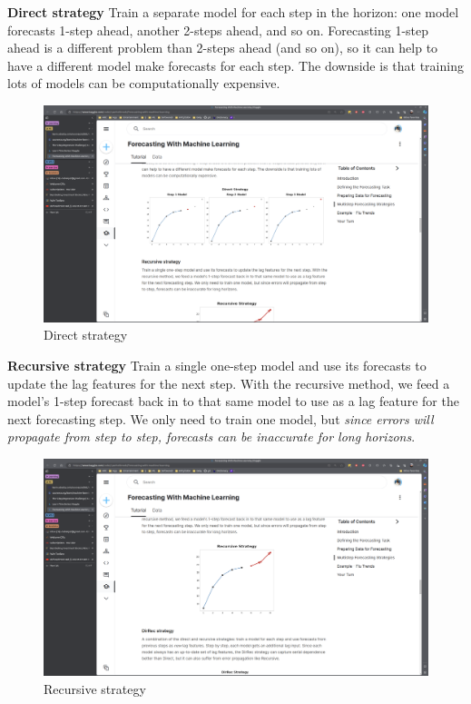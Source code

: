 \documentclass[12pt]{report}
\begin{document}
\textbf{Direct strategy} Train a separate model for each step in the horizon: one model forecasts 1-step ahead, another 2-steps ahead, and so on. Forecasting 1-step ahead is a different problem than 2-steps ahead (and so on), so it can help to have a different model make forecasts for each step. The downside is that training lots of models can be computationally expensive.

\begin{figure}[htbp]
  \begin{center}
    \includegraphics[trim =24cm 17.0cm 22cm 20cm, clip, scale=0.3]{pics/forecast2.png}
    \caption{Direct strategy}
    \label{fig:direct}
  \end{center}
\end{figure}

\textbf{Recursive strategy} Train a single one-step model and use its forecasts to update the lag features for the next step. With the recursive method, we feed a model's 1-step forecast back in to that same model to use as a lag feature for the next forecasting step. We only need to train one model, but \textit{since errors will propagate from step to step, forecasts can be inaccurate for long horizons}.

\begin{figure}[htbp]
  \begin{center}
    \includegraphics[trim =30cm 14.0cm 28cm 19cm, clip, scale=0.3]{pics/forecast3.png}
    \caption{Recursive strategy}
    \label{fig:recursive}
  \end{center}
\end{figure}
\end{document}
